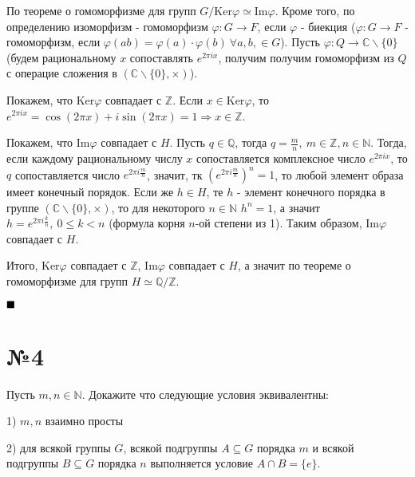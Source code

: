 \documentclass[a4paper, 16pt]{article}
\renewcommand{\C}{\mathbb{C}}
\newcommand{\N} {\mathbb{N}}
\newcommand{\Q} {\mathbb{Q}}
\newcommand{\Z} {\mathbb{Z}}
\newenvironment{proof}[1][Доказательство]{%
	\begin{trivlist}
		\item[\hskip \labelsep {\bfseries #1:}]
		\item \hspace{14pt}
	}{
		$ \hfill\blacksquare $
	\end{trivlist}
	\hfill\break
}
\begin{document}
	\begin{proof}
		По теореме о гомоморфизме для групп $G / \text{Ker}\varphi \simeq \text{Im} \varphi$. Кроме того, по определению изоморфизм - гомоморфизм $\varphi: G \to F$, если $\varphi$ - биекция ($\varphi: G \to F$ - гомоморфизм, если $\varphi(ab) = \varphi(a) \cdot \varphi(b) \ \forall a, b, \in G$). Пусть $\varphi: Q \to \C \backslash \{0\}$ (будем рациональному $x$ сопоставлять $e^{2\pi i x}$, получим получим гомоморфизм из $Q$ с операцие сложения в $(\C \backslash \{0\}, \times)$). 
		
		Покажем, что $\text{Ker} \varphi$ совпадает с $\Z$. Если $x \in \text{Ker} \varphi$, то $e^{2\pi ix} = \cos (2\pi x) + i \sin (2 \pi x) = 1 \Rightarrow x \in \Z$.
		
		Покажем, что $\text{Im} \varphi$ совпадает с $H$. Пусть $q \in \Q$, тогда $q = \frac{m}{n}, \ m \in \Z, n \in \N$. Тогда, если каждому рациональному числу $x$ сопоставляется комплексное число $e^{2\pi i x}$, то $q$ сопоставляется число $e^{2 \pi i \frac{m}{n}}$, значит, тк $(e^{2 \pi i \frac{m}{n}})^n = 1$, то любой элемент образа имеет конечный порядок. Если же $h \in H$, те $h$ - элемент конечного порядка в группе $(\C \backslash \{0\}, \times)$, то для некоторого $n \in \N$ $h^n = 1$, а значит $h = e^{2 \pi i \frac{k}{n}}, \ 0 \leq k < n$ (формула корня $n$-ой степени из 1). Таким образом, $\text{Im} \varphi$ совпадает с $H$.
		
		Итого, $\text{Ker} \varphi$ совпадает с $\Z$, $\text{Im} \varphi$ совпадает с $H$, а значит по теореме о гомоморфизме для групп $H \simeq \Q / \Z$. 
	\end{proof}

\section*{№4}

	Пусть $m, n \in \N$. Докажите что следующие условия эквивалентны:
	
	1) $m, n$ взаимно просты
	
	2) для всякой группы $G$, всякой подгруппы $A \subseteq  G$ порядка $m$ и всякой подгруппы $B \subseteq G$ порядка $n$ выполняется условие $A \cap B = \{e\}$.
	
\end{document}
